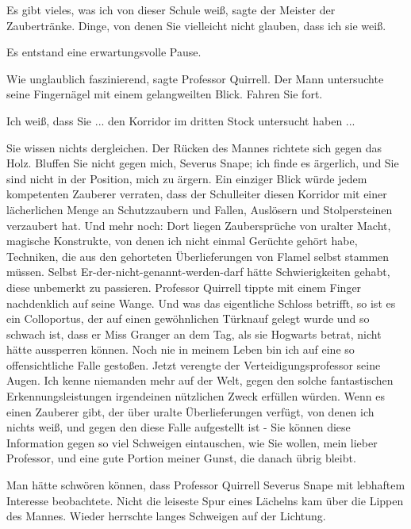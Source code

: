 \glqq{}Es gibt vieles, was ich von dieser Schule weiß\grqq{}, sagte der Meister
der Zaubertränke. \glqq{}Dinge, von denen Sie vielleicht nicht glauben, dass ich
sie weiß.\grqq{}

Es entstand eine erwartungsvolle Pause.

\glqq{}Wie unglaublich faszinierend\grqq{}, sagte Professor Quirrell. Der Mann
untersuchte seine Fingernägel mit einem gelangweilten Blick. \glqq{}Fahren Sie
fort.\grqq{}

\glqq{}Ich weiß, dass Sie ... den Korridor im dritten Stock untersucht haben
...\grqq{}

\glqq{}Sie wissen nichts dergleichen.\grqq{} Der Rücken des Mannes richtete sich
gegen das Holz. \glqq{}Bluffen Sie nicht gegen mich, Severus Snape; ich finde es
ärgerlich, und Sie sind nicht in der Position, mich zu ärgern. Ein einziger
Blick würde jedem kompetenten Zauberer verraten, dass der Schulleiter diesen
Korridor mit einer lächerlichen Menge an Schutzzaubern und Fallen, Auslösern und
Stolpersteinen verzaubert hat. Und mehr noch: Dort liegen Zaubersprüche von
uralter Macht, magische Konstrukte, von denen ich nicht einmal Gerüchte gehört
habe, Techniken, die aus den gehorteten Überlieferungen von Flamel selbst
stammen müssen. Selbst Er-der-nicht-genannt-werden-darf hätte Schwierigkeiten
gehabt, diese unbemerkt zu passieren.\grqq{} Professor Quirrell tippte mit einem
Finger nachdenklich auf seine Wange. \glqq{}Und was das eigentliche Schloss
betrifft, so ist es ein Colloportus, der auf einen gewöhnlichen Türknauf gelegt
wurde und so schwach ist, dass er Miss Granger an dem Tag, als sie Hogwarts
betrat, nicht hätte aussperren können. Noch nie in meinem Leben bin ich auf eine
so offensichtliche Falle gestoßen.\grqq{} Jetzt verengte der
Verteidigungsprofessor seine Augen. \glqq{}Ich kenne niemanden mehr auf der Welt,
gegen den solche fantastischen Erkennungsleistungen irgendeinen nützlichen Zweck
erfüllen würden. Wenn es einen Zauberer gibt, der über uralte Überlieferungen
verfügt, von denen ich nichts weiß, und gegen den diese Falle aufgestellt ist -
Sie können diese Information gegen so viel Schweigen eintauschen, wie Sie
wollen, mein lieber Professor, und eine gute Portion meiner Gunst, die danach
übrig bleibt.\grqq{}

Man hätte schwören können, dass Professor Quirrell Severus Snape mit lebhaftem
Interesse beobachtete. Nicht die leiseste Spur eines Lächelns kam über die
Lippen des Mannes. Wieder herrschte langes Schweigen auf der Lichtung.

